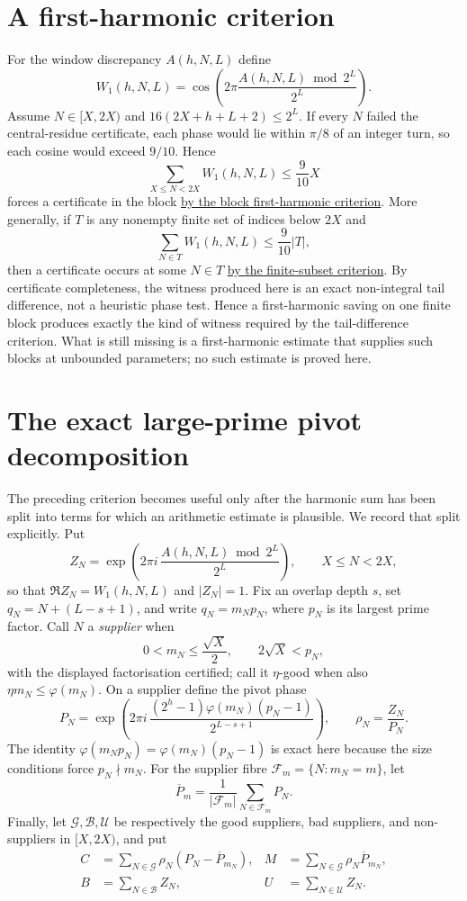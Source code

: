 \documentclass[11pt]{article}
\newcommand{\commit}{c24e2c2a781aa4a104d10884bacae52ef35cff30}
\newcommand{\repobase}{https://github.com/wcook04/plectis-lean-erdos249-257/blob/\commit}
\newcommand{\PK}{Erdos249257}
\newcommand{\lword}[4]{\href{\repobase/\PK/#1\#L#2}{#4}}
\theoremstyle{remark}\newtheorem*{remark}{Remark}
\newcommand{\ph}{\varphi}
\begin{document}
\section{A first-harmonic criterion}\label{sec:harmonic}
For the window discrepancy $A(h,N,L)$ define
\[
 W_1(h,N,L)=\cos\left(2\pi\frac{A(h,N,L)\bmod2^L}{2^L}\right).
\]
Assume $N\in[X,2X)$ and $16(2X+h+L+2)\le2^L$.  If every $N$ failed the
central-residue certificate, each phase would lie within $\pi/8$ of an
integer turn, so each cosine would exceed $9/10$.  Hence
\[
 \sum_{X\le N<2X}W_1(h,N,L)\le\frac9{10}X
\]
forces a certificate in the block
\lword{FirstHarmonicGap.lean}{128}{exists_certifiedKill_of_first_harmonic_gap}{by the block first-harmonic criterion}.
More generally, if $T$ is any nonempty finite set of indices below $2X$ and
\[
 \sum_{N\in T}W_1(h,N,L)\le\frac9{10}|T|,
\]
then a certificate occurs at some $N\in T$
\lword{FirstHarmonicGap.lean}{104}{exists_certifiedKill_of_first_harmonic_gap_subset}{by the finite-subset criterion}.
By certificate completeness, the witness produced here is an exact
non-integral tail difference, not a heuristic phase test.  Hence a
first-harmonic saving on one finite block produces exactly the kind of witness
required by the tail-difference criterion.  What is still missing is a
first-harmonic estimate that supplies such blocks at unbounded parameters; no
such estimate is proved here.

\section{The exact large-prime pivot decomposition}\label{sec:first-pivot}
The preceding criterion becomes useful only after the harmonic sum has been
split into terms for which an arithmetic estimate is plausible.  We record
that split explicitly.  Put
\[
 Z_N=\exp\!\left(
   2\pi i\,\frac{A(h,N,L)\bmod 2^L}{2^L}\right),
 \qquad X\le N<2X,
\]
so that \(\Re Z_N=W_1(h,N,L)\) and \(|Z_N|=1\).
Fix an overlap depth \(s\), set \(q_N=N+(L-s+1)\), and write
\(q_N=m_Np_N\), where \(p_N\) is its largest prime factor.  Call \(N\) a
\emph{supplier} when
\[
 0<m_N\le\frac{\sqrt X}{2},
 \qquad 2\sqrt X<p_N,
\]
with the displayed factorisation certified; call it \(\eta\)-good when also
\(\eta m_N\le\ph(m_N)\).  On a supplier define the pivot phase
\[
 P_N=\exp\!\left(
 2\pi i\,\frac{(2^h-1)\ph(m_N)(p_N-1)}{2^{L-s+1}}\right),
 \qquad \rho_N=\frac{Z_N}{P_N}.
\]
The identity \(\ph(m_Np_N)=\ph(m_N)(p_N-1)\) is exact here because the size
conditions force \(p_N\nmid m_N\).  For the supplier fibre
\(\mathcal F_m=\{N:m_N=m\}\), let
\[
 \overline P_m=\frac1{|\mathcal F_m|}
                 \sum_{N\in\mathcal F_m}P_N.
\]
Finally, let \(\mathcal G,\mathcal B,\mathcal U\) be respectively the good
suppliers, bad suppliers, and non-suppliers in \([X,2X)\), and put
\[
\begin{aligned}
 C&=\sum_{N\in\mathcal G}\rho_N(P_N-\overline P_{m_N}),&
 M&=\sum_{N\in\mathcal G}\rho_N\overline P_{m_N},\\
 B&=\sum_{N\in\mathcal B}Z_N,&
 U&=\sum_{N\in\mathcal U}Z_N.
\end{aligned}
\]
\end{document}
